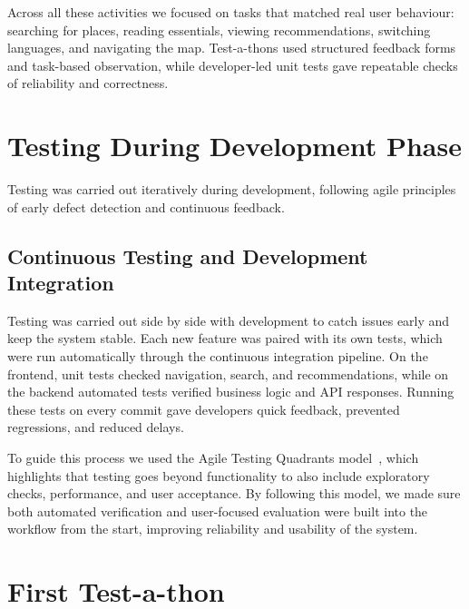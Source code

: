 Across all these activities we focused on tasks that matched real user behaviour: searching for places, reading essentials, viewing recommendations, switching languages, and navigating the map. Test-a-thons used structured feedback forms and task-based observation, while developer-led unit tests gave repeatable checks of reliability and correctness.



\clearpage
\cleardoublepage
\section{Testing During Development Phase}
\label{sec:dev-phase-testing}

Testing was carried out iteratively during development, following agile principles of early defect detection and continuous feedback. 
\subsection{Continuous Testing and Development Integration}
Testing was carried out side by side with development to catch issues early and keep the system stable. 
Each new feature was paired with its own tests, which were run automatically through the continuous 
integration pipeline. On the frontend, unit tests checked navigation, search, and recommendations, while 
on the backend automated tests verified business logic and API responses. Running these tests on every 
commit gave developers quick feedback, prevented regressions, and reduced delays.

To guide this process we used the Agile Testing Quadrants model~\cite{Crispin2009AgileTesting}, which 
highlights that testing goes beyond functionality to also include exploratory checks, performance, and user 
acceptance. By following this model, we made sure both automated verification and user-focused evaluation 
were built into the workflow from the start, improving reliability and usability of the system.


\cleardoublepage

\section{First Test-a-thon}
\label{sec:testathon-one}

